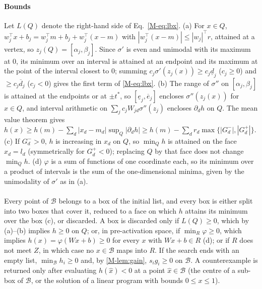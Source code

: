 \documentclass[11pt,a4paper]{article}
\newcommand{\B}{\mathcal{B}}
\newcommand{\sig}{\sigma}
\begin{document}
\paragraph{Bounds}
Let $L(Q)$ denote the right-hand side of Eq.~\eqref{M-eq:lbx}. (a) For $x\in Q$, $w_j^\top x+b_j=w_j^\top m+b_j+w_j^\top(x-m)$ with $|w_j^\top(x-m)|\le|w_j|^\top r$, attained at a
vertex, so $z_j(Q)=[\alpha_j,\beta_j]$. Since $\sig'$ is even and unimodal with its maximum at $0$, its minimum over an
interval is attained at an endpoint and its maximum at the point of the interval closest to $0$; summing
$c_j\sig'(z_j(x))\ge c_j\underline d_j$ ($c_j\ge0$) and $\ge c_j\overline d_j$ ($c_j<0$) gives the first term of
\eqref{M-eq:lbx}. (b) The range of $\sig''$ on $[\alpha_j,\beta_j]$ is attained at the endpoints or at $\pm t^\ast$, so
$[\underline e_j,\overline e_j]$ encloses $\sig''(z_j(x))$ for $x\in Q$, and interval arithmetic on
$\sum_jc_jW_{jd}\sig''(z_j)$ encloses $\partial_dh$ on $Q$. The mean value theorem gives
$h(x)\ge h(m)-\sum_d|x_d-m_d|\sup_Q|\partial_dh|\ge h(m)-\sum_dr_d\max\{|G^-_d|,|G^+_d|\}$. (c) If $G^-_d>0$, $h$ is
increasing in $x_d$ on $Q$, so $\min_Qh$ is attained on the face $x_d=l_d$ (symmetrically for $G^+_d<0$); replacing $Q$
by that face does not change $\min_Qh$. (d) $\varphi$ is a sum of functions of one coordinate each, so its minimum over a
product of intervals is the sum of the one-dimensional minima, given by the unimodality of $\sig'$ as in (a).

\paragraph{}
Every point of $\B$ belongs to a box of the initial list, and every box is either split into two boxes that cover it,
reduced to a face on which $h$ attains its minimum over the box (c), or discarded. A box is discarded only if
$L(Q)\ge0$, which by (a)--(b) implies $h\ge0$ on $Q$; or, in pre-activation space, if $\min_R\varphi\ge0$, which implies
$h(x)=\varphi(Wx+b)\ge0$ for every $x$ with $Wx+b\in R$ (d); or if $R$ does not meet $Z$, in which case no $x\in\B$ maps
into $R$. If the search ends with an empty list, $\min_\B h_i\ge0$ and, by \cref{M-lem:gain}, $s_ig_i\ge0$ on $\B$. A
counterexample is returned only after evaluating $h(\hat x)<0$ at a point $\hat x\in\B$ (the centre of a sub-box of $\B$,
or the solution of a linear program with bounds $0\le x\le1$).
\end{document}
